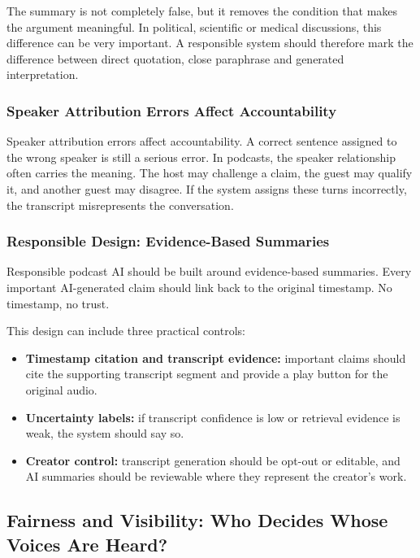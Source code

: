 \documentclass[11pt,a4paper]{article}
\begin{document}
The summary is not completely false, but it removes the condition that makes the argument meaningful. In political, scientific or medical discussions, this difference can be very important. A responsible system should therefore mark the difference between direct quotation, close paraphrase and generated interpretation.

\subsubsection{Speaker Attribution Errors Affect Accountability}

Speaker attribution errors affect accountability. A correct sentence assigned to the wrong speaker is still a serious error. In podcasts, the speaker relationship often carries the meaning. The host may challenge a claim, the guest may qualify it, and another guest may disagree. If the system assigns these turns incorrectly, the transcript misrepresents the conversation.

\subsubsection{Responsible Design: Evidence-Based Summaries}

Responsible podcast AI should be built around evidence-based summaries. Every important AI-generated claim should link back to the original timestamp. No timestamp, no trust.

This design can include three practical controls:

\begin{itemize}
    \item \textbf{Timestamp citation and transcript evidence:} important claims should cite the supporting transcript segment and provide a play button for the original audio.
    \item \textbf{Uncertainty labels:} if transcript confidence is low or retrieval evidence is weak, the system should say so.
    \item \textbf{Creator control:} transcript generation should be opt-out or editable, and AI summaries should be reviewable where they represent the creator's work.
\end{itemize}


\subsection{Fairness and Visibility: Who Decides Whose Voices Are Heard?}
\end{document}
